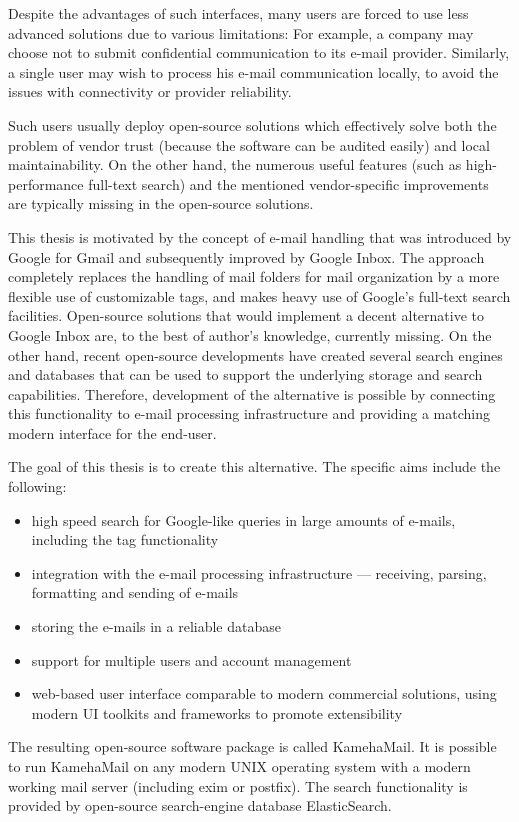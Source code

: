 Despite the advantages of such interfaces, many users are forced to use less advanced solutions due to various limitations: For example, a company may choose not to submit confidential communication to its e-mail provider. Similarly, a single user may wish to process his e-mail communication locally, to avoid the issues with connectivity or provider reliability.

Such users usually deploy open-source solutions which effectively solve both the problem of vendor trust (because the software can be audited easily) and local maintainability. On the other hand, the numerous useful features (such as high-performance full-text search) and the mentioned vendor-specific improvements are typically missing in the open-source solutions.

This thesis is motivated by the concept of e-mail handling that was introduced by Google for Gmail and subsequently improved by Google Inbox. The approach completely replaces the handling of mail folders for mail organization by a more flexible use of customizable tags, and makes heavy use of Google's full-text search facilities.
Open-source solutions that would implement a decent alternative to Google Inbox are, to the best of author's knowledge, currently missing.
On the other hand, recent open-source developments have created several search engines and databases that can be used to support the underlying storage and search capabilities. Therefore, development of the alternative is possible by connecting this functionality to e-mail processing infrastructure and providing a matching modern interface for the end-user.

The goal of this thesis is to create this alternative. The specific aims include the following:
\begin{itemize}
\item high speed search for Google-like queries in large amounts of e-mails, including the tag functionality
\item integration with the e-mail processing infrastructure --- receiving, parsing, formatting and sending of e-mails
\item storing the e-mails in a reliable database
\item support for multiple users and account management
\item web-based user interface comparable to modern commercial solutions, using modern UI toolkits and frameworks to promote extensibility
\end{itemize}
The resulting open-source software package is called KamehaMail. It is possible to run KamehaMail on any modern UNIX operating system with a modern working mail server (including exim or postfix). The search functionality is provided by open-source search-engine database ElasticSearch.

